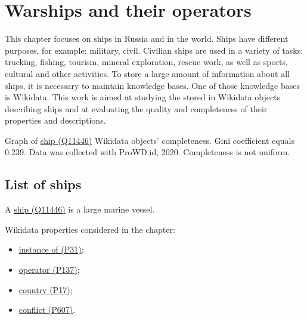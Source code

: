 \setchapterpreamble[u]{\margintoc}
\chapter[Warships and their operators]{Warships and their operators\protect\footnotemark}



This chapter focuses on ships in Russia and in the world. Ships have different purposes, for example: military, civil. Civilian ships are used in a variety of tasks: trucking, fishing, tourism, mineral exploration, rescue work, as well as sports, cultural and other activities. To store a large amount of information about all ships, it is necessary to maintain knowledge bases. One of those knowledge bases is Wikidata. This work is aimed at studying the stored in Wikidata objects describing ships and at evaluating the quality and completeness of their properties and descriptions.


\begin{marginfigure}[0.0cm]
  {
    \setlength{\fboxsep}{0pt}%
    \setlength{\fboxrule}{1pt}%
  }
  \caption[Graph of Wikidata objects' completeness]{Graph of \href{https://www.wikidata.org/wiki/Q11446}{ship (Q11446)} Wikidata objects' completeness. Gini coefficient equals 0.239. Data was collected with ProWD.id, 2020. Completeness is not uniform.}%
  \label{fig:prowd_ships-unbalanced}%
\end{marginfigure}

\section{List of ships}

A \href{https://www.wikidata.org/wiki/Q11446}{ship (Q11446)} is a large marine vessel.



Wikidata properties considered in the chapter: 
\begin{itemize}
  \item \href{https://www.wikidata.org/wiki/Property:P31}{instance of (P31)};
  \item \href{https://www.wikidata.org/wiki/Property:P137}{operator (P137)};
  \item \href{https://www.wikidata.org/wiki/Property:P17}{country (P17)};
  \item \href{https://www.wikidata.org/wiki/Property:P607}{conflict (P607)}.
\end{itemize}


